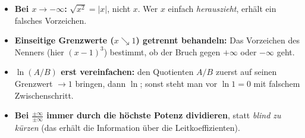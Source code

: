 \begin{achtung}
\begin{itemize}
  \item \textbf{Bei $x\to-\infty$:} $\sqrt{x^2}=|x|$, nicht $x$. Wer $x$
        einfach \emph{herauszieht}, erhält ein falsches Vorzeichen.
  \item \textbf{Einseitige Grenzwerte ($x\searrow 1$) getrennt behandeln:}
        Das Vorzeichen des Nenners (hier $(x-1)^3$) bestimmt, ob der Bruch
        gegen $+\infty$ oder $-\infty$ geht.
  \item \textbf{$\ln(A/B)$ erst vereinfachen:} den Quotienten $A/B$
        zuerst auf seinen Grenzwert $\to 1$ bringen, dann $\ln$; sonst
        steht man vor $\ln 1=0$ mit falschem Zwischenschritt.
  \item \textbf{Bei $\frac{\pm\infty}{\pm\infty}$ immer durch die höchste
        Potenz dividieren}, statt \emph{blind zu kürzen} (das erhält die
        Information über die Leitkoeffizienten).
\end{itemize}
\end{achtung}
